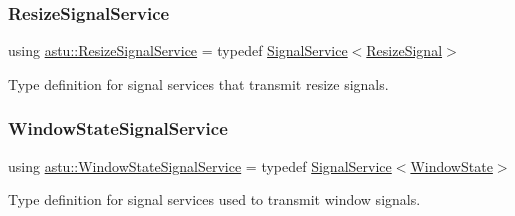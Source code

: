 \subsubsection{\texorpdfstring{Resize\+Signal\+Service}{ResizeSignalService}}
{\footnotesize\ttfamily using \hyperlink{group__input__group_ga5949d03cd17e1fe53096ce501f2eb408}{astu\+::\+Resize\+Signal\+Service} = typedef \hyperlink{classastu_1_1SignalService}{Signal\+Service}$<$\hyperlink{classastu_1_1ResizeSignal}{Resize\+Signal}$>$}

Type definition for signal services that transmit resize signals. \mbox{\label{group__input__group_ga6a683efe6c88e7ffcb0e912c5395bbc0}} 
\subsubsection{\texorpdfstring{Window\+State\+Signal\+Service}{WindowStateSignalService}}
{\footnotesize\ttfamily using \hyperlink{group__input__group_ga6a683efe6c88e7ffcb0e912c5395bbc0}{astu\+::\+Window\+State\+Signal\+Service} = typedef \hyperlink{classastu_1_1SignalService}{Signal\+Service}$<$\hyperlink{classastu_1_1WindowState}{Window\+State}$>$}

Type definition for signal services used to transmit window signals. 